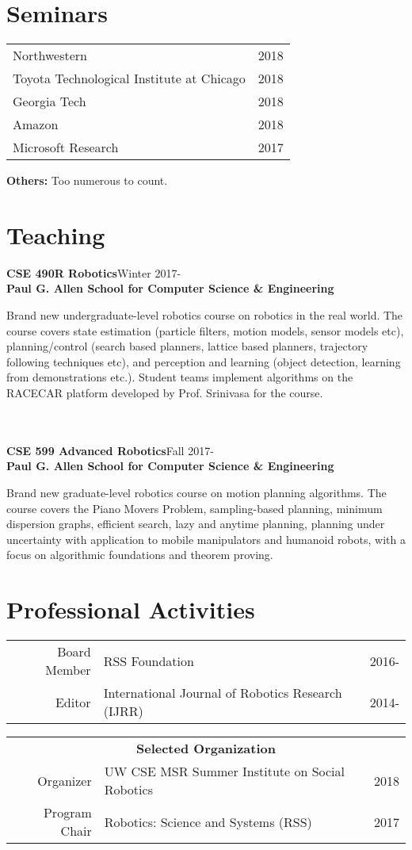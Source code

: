 \documentclass[10pt]{article}
\begin{document}
\section{Seminars}
\begin{center}
\begin{tabularx}{\linewidth}{Xr}
Northwestern & 2018\\
Toyota Technological Institute at Chicago & 2018\\
Georgia Tech & 2018\\
Amazon & 2018\\
Microsoft Research & 2017\\
\end{tabularx}
\end{center}
\noindent \textbf{Others:} Too numerous to count.

\section{Teaching}
\noindent
\textbf{CSE 490R Robotics}\hfill Winter 2017-\\
\textbf{Paul G. Allen School for Computer Science \& Engineering}\\
\parbox[t]{0.75\textwidth}{
Brand new undergraduate-level robotics course on robotics in the real world. The course covers state estimation (particle filters, motion models, sensor models etc), planning/control (search based planners, lattice based planners, trajectory following techniques etc), and perception and learning (object detection, learning from demonstrations etc.). Student teams implement algorithms on the RACECAR platform developed by Prof. Srinivasa for the course.
}\\
\\
\noindent
\textbf{CSE 599 Advanced Robotics}\hfill Fall 2017-\\
\textbf{Paul G. Allen School for Computer Science \& Engineering}\\
\parbox[t]{0.75\textwidth}{
Brand new graduate-level robotics course on motion planning algorithms. The course covers the Piano Movers Problem, sampling-based planning, minimum dispersion graphs, efficient search, lazy and anytime planning, planning under uncertainty with application to mobile manipulators and humanoid robots, with a focus on algorithmic foundations and theorem proving.
}

\section{Professional Activities}
\begin{tabularx}{\linewidth}{rXr}
Board Member & RSS Foundation & 2016-\\
Editor & International Journal of Robotics Research (IJRR) & 2014-\\
\end{tabularx}
\begin{tabularx}{\linewidth}{rXr}
\multicolumn{3}{c}{\textbf{Selected Organization}}\\
Organizer & UW CSE MSR Summer Institute on Social Robotics & 2018\\
Program Chair & Robotics: Science and Systems (RSS) & 2017\\
\end{tabularx}
\end{document}

